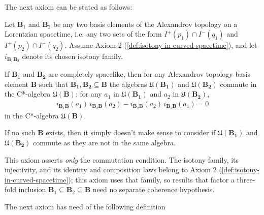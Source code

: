 The next axiom can be stated as follows:

\begin{definition}
    \label{def:local-commutativity-in-curved-spacetime}
    \leanok
    Let $\mathbf{B}_1$ and $\mathbf{B}_2$ be any two basis elements of the Alexandrov topology on a Lorentzian spacetime, i.e. any two sets of the form $I^+(p_1) \cap I^-(q_1)$ and $I^+(p_2) \cap I^-(q_2)$. Assume Axiom 2 (\ref{def:isotony-in-curved-spacetime}), and let $i_{\mathbf{B}_1\mathbf{B}_2}$ denote its chosen isotony family.

    If $\mathbf{B_1}$ and $\mathbf{B_2}$ are completely spacelike, then for any Alexandrov topology basis element $\mathbf{B}$ such that $\mathbf{B_1}, \mathbf{B_2} \subseteq \mathbf{B}$ the algebras $\mathfrak{U}(\mathbf{B_1})$ and $\mathfrak{U}(\mathbf{B_2})$ commute in the C*-algebra $\mathfrak{U}(\mathbf{B})$: for any $a_1$ in $\mathfrak{U}(\mathbf{B_1})$ and $a_2$ in $\mathfrak{U}(\mathbf{B_2})$,
    \begin{align}
        i_{\mathbf{B}_1\mathbf{B}}(a_1)\, i_{\mathbf{B}_2\mathbf{B}}(a_2) - i_{\mathbf{B}_2\mathbf{B}}(a_2)\, i_{\mathbf{B}_1\mathbf{B}}(a_1) = 0
    \end{align}
    in the C*-algebra $\mathfrak{U}(\mathbf{B})$.

    If no such $\mathbf{B}$ exists, then it simply doesn't make sense to consider if $\mathfrak{U}(\mathbf{B_1})$ and $\mathfrak{U}(\mathbf{B_2})$ commute as they are not in the same algebra.

    This axiom asserts \emph{only} the commutation condition. The isotony family, its injectivity, and its identity and composition laws belong to Axiom 2 (\ref{def:isotony-in-curved-spacetime}); this axiom uses that family, so results that factor a three-fold inclusion $\mathbf{B}_1 \subseteq \mathbf{B}_2 \subseteq \mathbf{B}$ need no separate coherence hypothesis.
\end{definition}

The next axiom has need of the following definition

